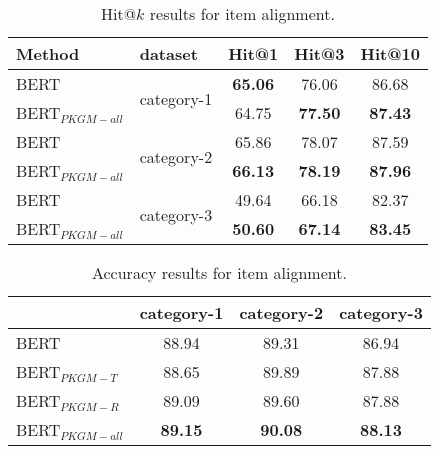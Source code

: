 \begin{table}[!hbpt]
    \centering
    \caption{Hit@$k$ results for item alignment.}
    \begin{tabular}{l |l|c | c|c  }
    \toprule
         Method & dataset  & Hit@1 &Hit@3 & Hit@10 \\
        \midrule
        BERT  & \multirow{2}{*}{category-1} & \textbf{65.06} & 76.06 & 86.68  \\
        BERT$_{PKGM-all}$ & & 64.75 &\textbf{77.50} & \textbf{87.43}  \\
        \midrule
        BERT  & \multirow{2}{*}{category-2} & 65.86 & 78.07 & 87.59  \\
        BERT$_{PKGM-all}$ & & \textbf{66.13} & \textbf{78.19} & \textbf{87.96}  \\
        \midrule
        BERT  & \multirow{2}{*}{category-3} & 49.64 & 66.18 & 82.37 \\
        BERT$_{PKGM-all}$ & & \textbf{50.60} & \textbf{67.14} & \textbf{83.45} \\
        \bottomrule
    \end{tabular}
    \label{tab:res-same-item-R}
\end{table}


\begin{table}[]
    \centering
    \caption{Accuracy results for item alignment.}
    \begin{tabular}{l|c c c }
        \toprule
          & category-1 & category-2 & category-3 \\
        \midrule
         BERT& 88.94 & 89.31  & 86.94 \\
         BERT$_{PKGM-T}$ & 88.65 & 89.89 & 87.88 \\
         BERT$_{PKGM-R}$ & 89.09 & 89.60 & 87.88 \\
         BERT$_{PKGM-all}$& \textbf{89.15} & \textbf{90.08} & \textbf{88.13} \\
        \bottomrule
    \end{tabular}
    \label{tab:res-same-item-C}
\end{table}
